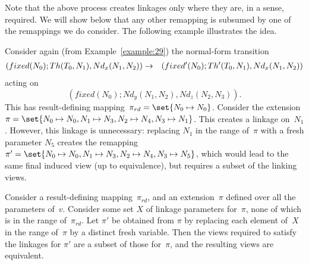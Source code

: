 Note that the above process creates linkages only where they are, in a sense,
required.  We will show below that any other remapping is subsumed by one of
the remappings we do consider.  The following example illustrates the idea. 
\begin{example}
Consider again (from Example~\ref{example:29}) the normal-form transition
\begin{eqnarray*}
(fixed(N_0); Th(T_0,N_1), Nd_x(N_1,N_2)) & \stackrel{}\rightarrow &
  (fixed'(N_0); Th'(T_0,N_1), Nd_x(N_1,N_2))
\end{eqnarray*}
acting on 
\[
(fixed(N_0); Nd_y(N_1,N_2), Nd_z(N_2,N_3)).
\]
This has result-defining mapping~$\pi_{rd} = \set{N_0 \mapsto N_0}$.  Consider
the extension $\pi = \set{N_0 \mapsto N_0, N_1 \mapsto N_3, N_2 \mapsto
  N_4,\linebreak[1] {N_3 \mapsto N_1}}$.  This creates a linkage on~$N_1$.
However, this linkage is unnecessary: replacing $N_1$ in the range of~$\pi$
with a fresh parameter $N_5$ creates the remapping $\pi' = \set{N_0 \mapsto
  N_0, N_1 \mapsto N_3, N_2 \mapsto N_4,\linebreak[1] {N_3 \mapsto N_5}}$,
which would lead to the same final induced view (up to equivalence), but
requires a subset of the linking views.
\end{example}




\begin{lemma}
Consider a result-defining mapping~$\pi_{rd}$, and an extension~$\pi$ defined
over all the parameters of~$v$.  Consider some set $X$ of linkage parameters
for~$\pi$, none of which is in the range of~$\pi_{rd}$.  Let $\pi'$ be
obtained from $\pi$ by replacing each element of~$X$ in the range of~$\pi$ by
a distinct fresh variable.  Then the views required to satisfy the linkages
for $\pi'$ are a subset of those for~$\pi$, and the resulting views are
equivalent.
\end{lemma}

